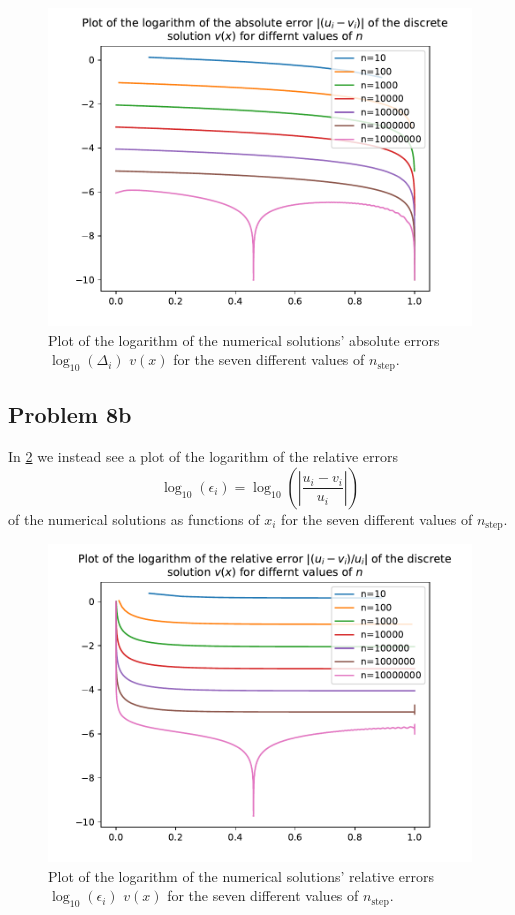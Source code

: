 \documentclass[english,notitlepage]{revtex4-1}  %
\begin{document}
\begin{figure}[h!]
    \centering 
    \includegraphics[scale=0.80]{../data/absolute_error.pdf} %
    \caption{Plot of the logarithm of the numerical solutions' absolute errors $\log_{10}(\Delta_i)$ $v(x)$ for the seven different values of $n_\text{step}$.}
    \label{abs err}
\end{figure}

\subsection*{Problem 8b}
In \cref{rel err} we instead see a plot of the logarithm of the relative errors 
\begin{equation}
    \log_{10}(\epsilon_i) = \log_{10}\left(\left|\frac{u_i - v_i}{u_i}\right|\right)
\end{equation}
of the numerical solutions as functions of $x_i$ for the seven different values of $n_\text{step}$.

\begin{figure}[h!]
    \centering 
    \includegraphics[scale=0.80]{../data/relative_error.pdf} %
    \caption{Plot of the logarithm of the numerical solutions' relative errors $\log_{10}(\epsilon_i)$ $v(x)$ for the seven different values of $n_\text{step}$.}
    \label{rel err}
\end{figure}
\end{document}
